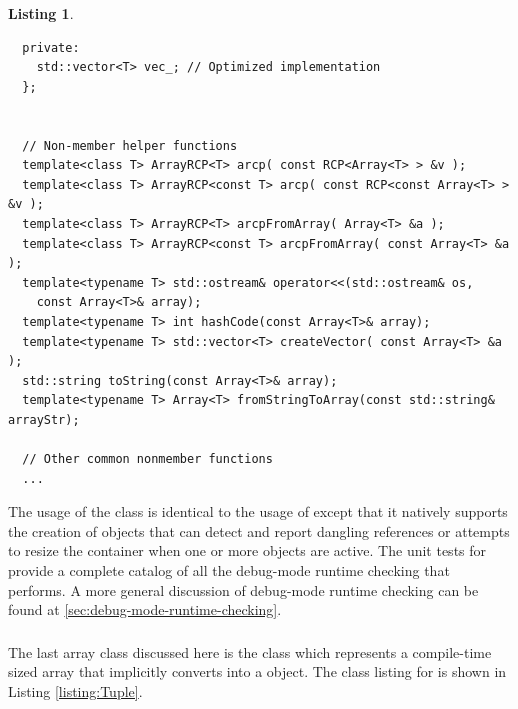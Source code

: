 \documentclass[pdf,ps2pdf,11pt]{SANDreport}
\newtheorem{listing}{Listing}
\begin{document}
\begin{listing}
{\begin{verbatim}
  private:
    std::vector<T> vec_; // Optimized implementation
  };
  
  
  // Non-member helper functions
  template<class T> ArrayRCP<T> arcp( const RCP<Array<T> > &v );
  template<class T> ArrayRCP<const T> arcp( const RCP<const Array<T> > &v );
  template<class T> ArrayRCP<T> arcpFromArray( Array<T> &a );
  template<class T> ArrayRCP<const T> arcpFromArray( const Array<T> &a );
  template<typename T> std::ostream& operator<<(std::ostream& os,
    const Array<T>& array);
  template<typename T> int hashCode(const Array<T>& array);
  template<typename T> std::vector<T> createVector( const Array<T> &a );
  std::string toString(const Array<T>& array);
  template<typename T> Array<T> fromStringToArray(const std::string& arrayStr);

  // Other common nonmember functions
  ...
\end{verbatim}}
\end{listing}

The usage of the {} class is identical to the usage of
{} except that it natively supports the creation of
{} objects that can detect and report dangling
references or attempts to resize the container when one or more
{} objects are active.  The unit tests for
{} provide a complete catalog of all the debug-mode runtime
checking that {} performs.  A more general discussion of
debug-mode runtime checking can be found at
{}\ref{sec:debug-mode-runtime-checking}.


%
{}\subsubsection{}
%

The last array class discussed here is the {} class
which represents a compile-time sized array that implicitly converts
into a {} object.  The class listing for
{} is shown in Listing {}\ref{listing:Tuple}.
\end{document}
